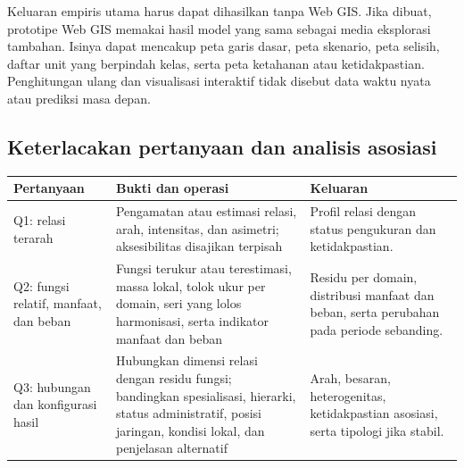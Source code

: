 \documentclass[11pt,a4paper,oneside,openany,indonesian]{report}
\begin{document}
Keluaran empiris utama harus dapat dihasilkan tanpa Web GIS. Jika dibuat,
prototipe Web GIS memakai hasil model yang sama sebagai media eksplorasi
tambahan. Isinya dapat mencakup peta garis dasar, peta skenario, peta
selisih, daftar unit yang berpindah kelas, serta peta ketahanan atau
ketidakpastian. Penghitungan ulang dan visualisasi interaktif tidak
disebut data waktu nyata atau prediksi masa depan.

\subsection{Keterlacakan pertanyaan dan analisis
asosiasi}\label{keterlacakan-pertanyaan-dan-analisis-asosiasi}

{\def\LTcaptype{none} %
\begin{longtable}[]{@{}
  >{\raggedright\arraybackslash}p{}
  >{\raggedright\arraybackslash}p{}
  >{\raggedright\arraybackslash}p{}@{}}
\toprule\noalign{}
\begin{minipage}[b]{\linewidth}\raggedright
Pertanyaan
\end{minipage} & \begin{minipage}[b]{\linewidth}\raggedright
Bukti dan operasi
\end{minipage} & \begin{minipage}[b]{\linewidth}\raggedright
Keluaran
\end{minipage} \\
\midrule\noalign{}
\endhead
\bottomrule\noalign{}
\endlastfoot
Q1: relasi terarah & Pengamatan atau estimasi relasi, arah, intensitas,
dan asimetri; aksesibilitas disajikan terpisah & Profil relasi dengan
status pengukuran dan ketidakpastian. \\
Q2: fungsi relatif, manfaat, dan beban & Fungsi terukur atau terestimasi,
massa lokal, tolok ukur per domain, seri yang lolos harmonisasi, serta
indikator manfaat dan beban & Residu per domain, distribusi manfaat dan
beban, serta perubahan pada periode sebanding. \\
Q3: hubungan dan konfigurasi hasil & Hubungkan dimensi relasi dengan
residu fungsi; bandingkan spesialisasi, hierarki, status administratif,
posisi jaringan, kondisi lokal, dan penjelasan alternatif & Arah,
besaran, heterogenitas, ketidakpastian asosiasi, serta tipologi jika
stabil. \\
\end{longtable}
}
\end{document}
